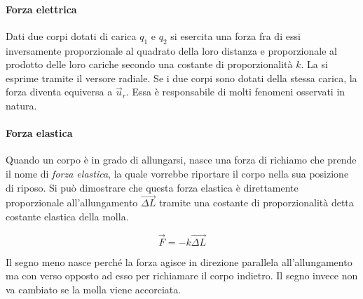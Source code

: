 \paragraph{Forza elettrica} Dati due corpi dotati di carica $q_1$ e $q_2$ si esercita una forza fra di essi inversamente proporzionale al quadrato della loro distanza e proporzionale al prodotto delle loro cariche secondo una costante di proporzionalità $k$. La si esprime tramite il versore radiale. Se i due corpi sono dotati della stessa carica, la forza diventa equiversa a $\vec{u}_r$. Essa è responsabile di molti fenomeni osservati in natura.

\paragraph{Forza elastica} Quando un corpo è in grado di allungarsi, nasce una forza di richiamo che prende il nome di \emph{forza elastica}, la quale vorrebbe riportare il corpo nella sua posizione di riposo. Si può dimostrare che questa forza elastica è direttamente proporzionale all'allungamento $\vec{\Delta L}$ tramite una costante di proporzionalità detta costante elastica della molla.

\[
	\vec{F}=-k\vec{\Delta L}
\]

Il segno meno nasce perché la forza agisce in direzione parallela all'allungamento ma con verso opposto ad esso per richiamare il corpo indietro. Il segno invece non va cambiato se la molla viene accorciata.

